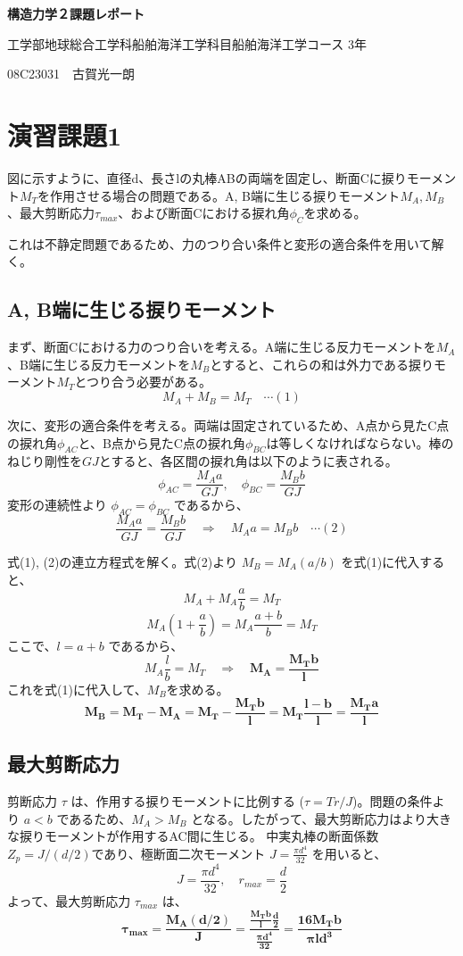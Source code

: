 \documentclass[a4j,12pt]{jsarticle}
\begin{document}
\textbf{構造力学２課題レポート}

工学部地球総合工学科船舶海洋工学科目船舶海洋工学コース 3年

08C23031　古賀光一朗


\vspace{3cm}
\section*{演習課題1}
図に示すように、直径d、長さlの丸棒ABの両端を固定し、断面Cに捩りモーメント$M_T$を作用させる場合の問題である。A, B端に生じる捩りモーメント$M_A, M_B$、最大剪断応力$\tau_{max}$、および断面Cにおける捩れ角$\phi_C$を求める。

これは不静定問題であるため、力のつり合い条件と変形の適合条件を用いて解く。

\subsection*{A, B端に生じる捩りモーメント}
まず、断面Cにおける力のつり合いを考える。A端に生じる反力モーメントを$M_A$、B端に生じる反力モーメントを$M_B$とすると、これらの和は外力である捩りモーメント$M_T$とつり合う必要がある。
$$M_A + M_B = M_T \quad \cdots(1)$$

次に、変形の適合条件を考える。両端は固定されているため、A点から見たC点の捩れ角$\phi_{AC}$と、B点から見たC点の捩れ角$\phi_{BC}$は等しくなければならない。棒のねじり剛性を$GJ$とすると、各区間の捩れ角は以下のように表される。
$$\phi_{AC} = \frac{M_A a}{GJ}, \quad \phi_{BC} = \frac{M_B b}{GJ}$$
変形の連続性より $\phi_{AC} = \phi_{BC}$ であるから、
$$\frac{M_A a}{GJ} = \frac{M_B b}{GJ} \quad \Rightarrow \quad M_A a = M_B b \quad \cdots(2)$$

式(1), (2)の連立方程式を解く。式(2)より $M_B = M_A (a/b)$ を式(1)に代入すると、
$$M_A + M_A \frac{a}{b} = M_T$$
$$M_A \left(1 + \frac{a}{b}\right) = M_A \frac{a+b}{b} = M_T$$
ここで、$l=a+b$ であるから、
$$M_A \frac{l}{b} = M_T \quad \Rightarrow \quad \boldsymbol{M_A = \frac{M_T b}{l}}$$
これを式(1)に代入して、$M_B$を求める。
$$\boldsymbol{M_B = M_T - M_A = M_T - \frac{M_T b}{l} = M_T \frac{l-b}{l} = \frac{M_T a}{l}}$$

\subsection*{最大剪断応力}
剪断応力 $\tau$ は、作用する捩りモーメントに比例する ($\tau = Tr/J$)。問題の条件より $a<b$ であるため、$M_A > M_B$ となる。したがって、最大剪断応力はより大きな捩りモーメントが作用するAC間に生じる。
中実丸棒の断面係数$Z_p = J/(d/2)$であり、極断面二次モーメント $J = \frac{\pi d^4}{32}$ を用いると、
$$J = \frac{\pi d^4}{32}, \quad r_{max} = \frac{d}{2}$$
よって、最大剪断応力 $\tau_{max}$ は、
$$\boldsymbol{\tau_{max} = \frac{M_A (d/2)}{J} = \frac{\frac{M_T b}{l} \frac{d}{2}}{\frac{\pi d^4}{32}} = \frac{16 M_T b}{\pi l d^3}}$$
\end{document}
